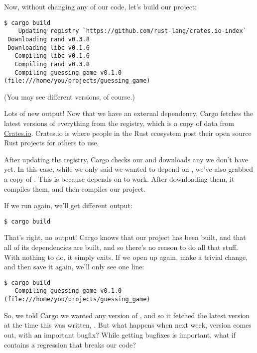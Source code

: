 \blank

Now, without changing any of our code, let’s build our project:

\begin{verbatim}
$ cargo build
    Updating registry `https://github.com/rust-lang/crates.io-index`
 Downloading rand v0.3.8
 Downloading libc v0.1.6
   Compiling libc v0.1.6
   Compiling rand v0.3.8
   Compiling guessing_game v0.1.0 (file:///home/you/projects/guessing_game)

\end{verbatim}

(You may see different versions, of course.)

\blank

Lots of new output! Now that we have an external dependency, Cargo fetches the latest versions of everything from the registry, 
which is a copy of data from \href{https://crates.io/}{Crates.io}. Crates.io is where people in the Rust ecosystem post their 
open source Rust projects for others to use.

\blank

After updating the registry, Cargo checks our \code{[dependencies]} and downloads any we don’t have yet. In this case, while we 
only said we wanted to depend on , we’ve also grabbed a copy of . This is because  depends on 
 to work. After downloading them, it compiles them, and then compiles our project.

\blank

If we run  again, we’ll get different output:

\begin{verbatim}
$ cargo build
\end{verbatim}

That’s right, no output! Cargo knows that our project has been built, and that all of its dependencies are built, and so there’s 
no reason to do all that stuff. With nothing to do, it simply exits. If we open up  again, make a trivial 
change, and then save it again, we’ll only see one line:

\begin{verbatim}
$ cargo build
   Compiling guessing_game v0.1.0 (file:///home/you/projects/guessing_game)
\end{verbatim}

So, we told Cargo we wanted any  version of , and so it fetched the latest version at the time this was
written, . But what happens when next week, version  comes out, with an important bugfix? While getting
bugfixes is important, what if  contains a regression that breaks our code?

